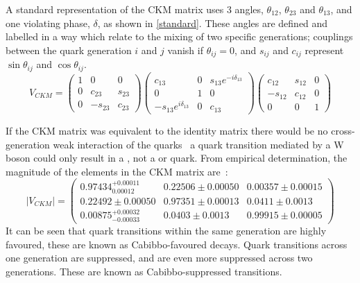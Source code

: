 A standard representation of the CKM matrix uses 3 angles, $\theta_{12}$, $\theta_{23}$ and $\theta_{13}$, and one \CP violating phase, $\delta$, as shown in \eqn\ref{standard}. These angles are defined and labelled in a way which relate to the mixing of two specific generations; couplings between the quark generation $i$ and $j$ vanish if $\theta_{ij} = 0$, and $s_{ij}$ and $c_{ij}$ represent $\sin\theta_{ij}$ and $\cos\theta_{ij}$.
\begin{equation}
V_{CKM} = \begin{pmatrix} 1 & 0 & 0 \\ 
0 & c_{23} & s_{23} \\ 
0 & -s_{23} & c_{23} \end{pmatrix}
\begin{pmatrix} c_{13} & 0 & s_{13}e^{-i\delta_{13}} \\ 
0 & 1 & 0 \\ 
-s_{13}e^{i\delta_{13}} & 0 & c_{13} \end{pmatrix}
\begin{pmatrix} c_{12} & s_{12} & 0 \\ 
-s_{12} & c_{12} & 0 \\ 
0 & 0 & 1 \end{pmatrix}
\label{standard}
\end{equation}

If the CKM matrix was equivalent to the identity matrix there would be no cross-generation weak interaction of the quarks \eg\ a \uquark quark transition mediated by a W boson could only result in a \dquark, not a \squark or \bquark quark. From empirical determination, the magnitude of the elements in the CKM matrix are~\cite{PDG2016}:
\begin{equation}
| V_{CKM} | = \begin{pmatrix} 0.97434^{+0.00011}_{0.00012} & 0.22506 \pm 0.00050 & 0.00357 \pm 0.00015 \\ 0.22492 \pm 0.00050 & 0.97351 \pm 0.00013 & 0.0411 \pm 0.0013 \\ 0.00875^{+0.00032}_{-0.00033} & 0.0403 \pm 0.0013 & 0.99915 \pm 0.00005 \end{pmatrix}
\end{equation}
It can be seen that quark transitions within the same generation are highly favoured, these are known as Cabibbo-favoured decays. Quark transitions across one generation are suppressed, and are even more suppressed across two generations. These are known as Cabibbo-suppressed transitions. 

